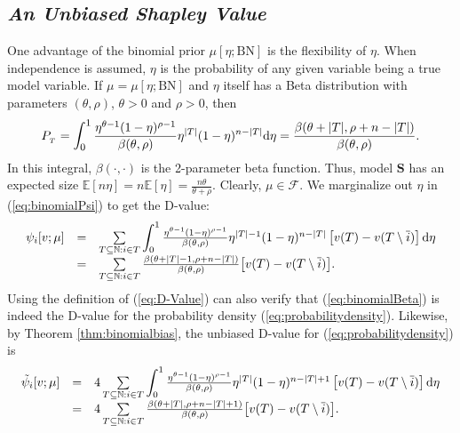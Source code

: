 \documentclass[a4paper,12pt]{article}
\begin{document}
\subsection{\textit{An Unbiased Shapley Value}}
\noindent One advantage of the binomial prior $\mu [\eta; \mathrm{BN}]$ is the flexibility of $\eta$.
When independence is assumed, $\eta$ is the probability of any given variable being a true model variable.
If $\mu = \mu [\eta; \mathrm{BN}]$ and $\eta$ itself has a Beta distribution with parameters $(\theta,\rho)$, $\theta>0$ and $\rho>0$, then
\begin{equation} \label{eq:probabilitydensity}
P_{_T} 
=
\mathop{\mathlarger{\int_0^1}}
\frac{\eta^{\theta-1}(1-\eta)^{\rho-1}}{\beta (\theta, \rho)} \eta^{|T|} (1-\eta)^{n-|T|} \mathrm{d} \eta 
=
\frac{\beta(\theta+|T|,\rho+n-|T|)}{\beta(\theta,\rho)}.
\end{equation}
In this integral, $\beta (\cdot,\cdot)$ is the 2-parameter beta function. Thus, model $\mathbf{S}$ 
has an expected size $\mathbb{E} [n \eta] = n \mathbb{E} [\eta]= \frac{n \theta}{\theta+\rho}$. 
Clearly, $\mu \in \mathscr{F}$. We marginalize out $\eta$ in (\ref{eq:binomialPsi}) to get the D-value: 
\begin{equation}\label{eq:binomialBeta}
\begin{array}{rcl}
\psi_i [v;\mu] 
&=& 
\sum\limits_{T\subseteq \mathbb{N}: i \in T}  
\mathop{\mathlarger{\int_0^1}}
\frac{\eta^{\theta-1}(1-\eta)^{\rho-1}}{\beta(\theta,\rho)}  \eta^{|T|-1} (1-\eta)^{n-|T|} 
\left [ v(T) - v(T\setminus \overline{i}) \right ] \mathrm{d}\eta \\

&=& \sum\limits_{T \subseteq \mathbb{N}: i \in T} \frac{\beta(\theta+|T|-1, \rho+n-|T|)}{\beta(\theta,\rho)} \big[ v(T) - v(T\setminus \overline{i}) \big].
\end{array}
\end{equation}
Using the definition of (\ref{eq:D-Value}) can also verify that (\ref{eq:binomialBeta}) is indeed the D-value for the probability density (\ref{eq:probabilitydensity}).
Likewise, by Theorem \ref{thm:binomialbias}, the  unbiased D-value for (\ref{eq:probabilitydensity}) is
\begin{equation}\label{eq:adjustBinomialBeta}
\begin{array}{rcl}
 \tilde \psi_i[v; \mu]
&=& 
4 \sum\limits_{T\subseteq \mathbb{N}: i \in T} 
\mathop{\mathlarger{\int_0^1}}
\frac{\eta^{\theta-1} (1-\eta)^{\rho-1}}{\beta(\theta,\rho)} \eta^{|T|} (1-\eta)^{n-|T|+1} 
\left [ v(T)-v(T\setminus \overline{i}) \right ] \mathrm{d} \eta\\

&=& 
4 \sum\limits_{T\subseteq \mathbb{N}: i \in T} 
\frac{\beta(\theta+|T|,\rho+n-|T|+1)}{\beta(\theta,\rho)} \big[ v(T)-v(T\setminus \overline{i}) \big].
\end{array}
\end{equation}
\end{document}
